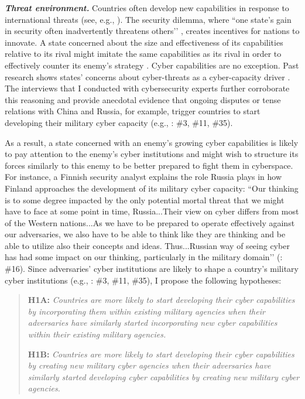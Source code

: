 \documentclass[12pt, letterpaper]{article}
\theoremstyle{plain}
\theoremstyle{remark}
\begin{document}
\noindent
\textit{\textbf{Threat environment.}}
Countries often develop new capabilities in response to international threats (see, e.g., \citealt{jervis1978cooperation, waltz1979theory, posen1993nationalism, Resende2007}). The security dilemma, where ``one state’s gain in security often inadvertently threatens others’’ \citep[170]{jervis1978cooperation}, creates incentives for nations to innovate. %
A state concerned about the size and effectiveness of its capabilities relative to its rival might imitate the same capabilities as its rival in order to effectively counter its enemy’s strategy \citep{Resende2007, Evangelista1984WP}.
Cyber capabilities are no exception.
Past research shows states' concerns about cyber-threats as a cyber-capacity driver \citep{gomez2016arming, Calderaro2020}.
The interviews that I conducted with cybersecurity experts further corroborate this reasoning and provide anecdotal evidence that ongoing disputes or tense relations with China and Russia, for example, trigger countries to start developing their military cyber capacity (e.g., \citealp{interviews2019}: \#3, \#11, \#35). 


As a result, a state concerned with an enemy’s growing cyber capabilities is likely to pay attention to the enemy's cyber institutions and might wish to structure its forces similarly to this enemy to be better prepared to fight them in cyberspace.  
For instance, a Finnish security analyst explains the role Russia plays in how Finland approaches the development of its military cyber capacity: ``Our thinking is to some degree impacted by the only potential mortal threat that we might have to face at some point in time, Russia...Their view on cyber differs from most of the Western nations...As we have to be prepared to operate effectively against our adversaries, we also have to be able to think like they are thinking and be able to utilize also their concepts and ideas. Thus...Russian way of seeing cyber has had some impact on our thinking, particularly in the military domain’’ (\citealp{interviews2019}: \#16). 
Since adversaries' cyber institutions are likely to shape a country's military cyber institutions (e.g., \citealp{interviews2019}: \#3, \#11, \#35), I propose the following hypotheses: 


\begin{quote}
	\textbf{H1A:} 
	\textit{Countries are more likely to start developing their cyber capabilities by incorporating them within existing military agencies when their adversaries have similarly started incorporating new cyber capabilities within their existing military agencies. 
	}
	 
	
	\textbf{H1B:} 
	\textit{Countries are more likely to start developing their cyber capabilities by creating new military cyber agencies when their adversaries have similarly started developing cyber capabilities by creating new military cyber agencies.}
	
\end{quote}
 
\end{document}
